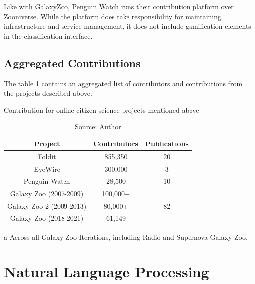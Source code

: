Like with GalaxyZoo, Penguin Watch runs their contribution platform over Zooniverse. While the platform does take responsibility for maintaining infrastructure and service management, it does not include gamification elements in the classification interface.

\subsection{Aggregated Contributions}

The table \ref{tab:cs-contributions} contains an aggregated list of contributors and contributions from the projects described above.

\begin{table}[h]
\centering
\caption{Contribution for online citizen science projects mentioned above}
\label{tab:cs-contributions}
\begin{threeparttable}
    \small{
    \begin{tabular}{|c|c|c|}
        \hline 
        Project & Contributors & Publications \\ \hline
        Foldit & 855,350 \cite{foldit2021players} & 20 \cite{foldit2021publications} \\ \hline
        EyeWire & 300,000 \cite{eyewire2017players} & 3 \cite{eyewire2021publications} \\ \hline
        Penguin Watch & 28,500 \cite{penguin2021players} & 10 \cite{penguin2021publications} \\ \hline
        Galaxy Zoo (2007-2009) & 100,000+ \cite{lintott2011galaxy} & \multirow{3}{*}{82 \cite{galaxyzoo2021publications}\tnote{~a}} \\ \cline{1-2} 
        Galaxy Zoo 2 (2009-2013) & 80,000+ \cite{galaxyzoo22021volunteers} & \\ \cline{1-2} 
        Galaxy Zoo (2018-2021) & 61,149 \cite{galaxyzoo2021players} & \\ \hline 
    \end{tabular}}
    \begin{tablenotes}
        \item[a] Across all Galaxy Zoo Iterations, including Radio and Supernova Galaxy Zoo.
    \end{tablenotes}
\end{threeparttable}
\caption*{Source: Author}
\end{table}

\section{Natural Language Processing}

